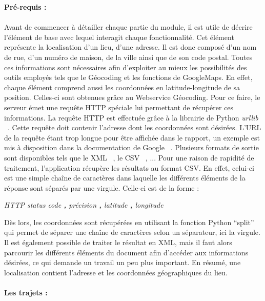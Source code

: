 \documentclass[12pt, a4paper, oneside]{article}
\begin{document}
    {\textbf{Pré-requis :}\\\\
    \indent Avant de commencer à détailler chaque partie du module, il est utile de décrire l'élément de base avec lequel interagit chaque fonctionnalité. Cet élément représente la localisation d'un lieu, d'une adresse. Il est donc composé d'un nom de rue, d'un numéro de maison, de la ville ainsi que de son code postal. Toutes ces informations sont nécessaires afin d'exploiter au mieux les possibilités des outils employés tels que le Géocoding et les fonctions de GoogleMaps. En effet, chaque élément comprend aussi les coordonnées en latitude-longitude de sa position. Celles-ci sont obtenues grâce au Webservice Géocoding. Pour ce faire, le serveur émet une requête HTTP spéciale lui permettant de récupérer ces informations. La requête HTTP est effectuée grâce à la librairie de Python \textit{urllib} ~\cite{py-urllib}. Cette requête doit contenir l'adresse dont les coordonnées sont désirées. L'URL de la requête étant trop longue pour être affichée dans le rapport, un exemple est mis à disposition dans la documentation de Google ~\cite{google-geodoc}. Plusieurs formats de sortie sont disponibles tels que le XML ~\cite{XML}, le CSV ~\cite{CSV}, ... Pour une raison de rapidité de traitement, l'application récupère les résultats au format CSV. En effet, celui-ci est une simple chaîne de caractères dans laquelle les différents éléments de la réponse sont séparés par une virgule. Celle-ci est de la forme :
    \begin{center}
        \textit{HTTP status code \textbf{,} précision \textbf{,} latitude \textbf{,} longitude}
    \end{center}
    Dès lors, les coordonnées sont récupérées en utilisant la fonction Python ``split'' ~\cite{python-split} qui permet de séparer une chaîne de caractères selon un séparateur, ici la virgule. Il est également possible de traiter le résultat en XML, mais il faut alors parcourir les différents éléments du document afin d'accéder aux informations désirées, ce qui demande un travail un peu plus important. En résumé, une localisation contient l'adresse et les coordonnées géographiques du lieu.\\\\
    {\textbf{Les trajets :}\\\\
}}
\end{document}
